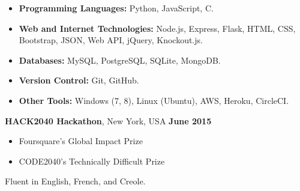 \documentclass[11pt]{article} %
\begin{document}
\begin{itemize}\itemsep0em
  \item \textbf{Programming Languages:} Python, JavaScript, C.
  \item \textbf{Web and Internet Technologies:} Node.js, Express, Flask, HTML, CSS, Bootstrap, JSON, Web API, jQuery, Knockout.js.
  \item \textbf{Databases:} MySQL, PostgreSQL, SQLite, MongoDB.
  \item \textbf{Version Control:} Git, GitHub.
  \item \textbf{Other Tools:} Windows (7, 8), Linux (Ubuntu), AWS, Heroku, CircleCI.
\end{itemize}
\medskip
{} \medskip

\noindent \centerline{\normalsize  \textbf {HACK2040 Hackathon}, New York, USA \hfill \textbf{June 2015}}
\begin{itemize}\itemsep0em
  \item Foursquare's Global Impact Prize
  \item CODE2040's Technically Difficult Prize
\end{itemize}

 Fluent in English, French, and Creole. 
\end{document}
